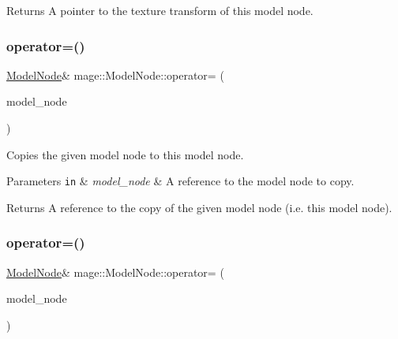 \begin{DoxyReturn}{Returns}
A pointer to the texture transform of this model node. 
\end{DoxyReturn}
\hypertarget{classmage_1_1_model_node_ad8378279b79930dfe98d176dbc1c5db9}{}\label{classmage_1_1_model_node_ad8378279b79930dfe98d176dbc1c5db9} 
\subsubsection{\texorpdfstring{operator=()}{operator=()}\hspace{0.1cm}{\footnotesize\ttfamily [1/2]}}
{\footnotesize\ttfamily \hyperlink{classmage_1_1_model_node}{Model\+Node}\& mage\+::\+Model\+Node\+::operator= (\begin{DoxyParamCaption}\item[{const \hyperlink{classmage_1_1_model_node}{Model\+Node} \&}]{model\+\_\+node }\end{DoxyParamCaption})\hspace{0.3cm}{\ttfamily [delete]}}

Copies the given model node to this model node.


\begin{DoxyParams}[1]{Parameters}
\mbox{\tt in}  & {\em model\+\_\+node} & A reference to the model node to copy. \\
\hline
\end{DoxyParams}
\begin{DoxyReturn}{Returns}
A reference to the copy of the given model node (i.\+e. this model node). 
\end{DoxyReturn}
\hypertarget{classmage_1_1_model_node_ad39321f4d392aa4e28169b8d7a08af68}{}\label{classmage_1_1_model_node_ad39321f4d392aa4e28169b8d7a08af68} 
\subsubsection{\texorpdfstring{operator=()}{operator=()}\hspace{0.1cm}{\footnotesize\ttfamily [2/2]}}
{\footnotesize\ttfamily \hyperlink{classmage_1_1_model_node}{Model\+Node}\& mage\+::\+Model\+Node\+::operator= (\begin{DoxyParamCaption}\item[{\hyperlink{classmage_1_1_model_node}{Model\+Node} \&\&}]{model\+\_\+node }\end{DoxyParamCaption})\hspace{0.3cm}{\ttfamily [delete]}}

